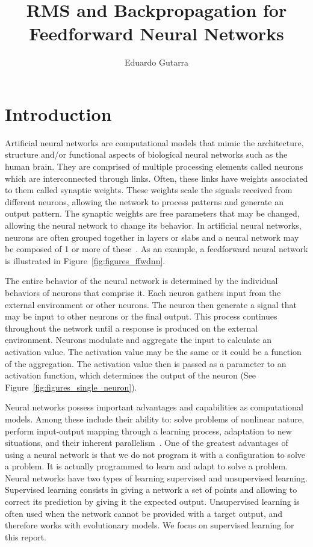 \documentclass[11pt]{article}
\title{RMS and Backpropagation for Feedforward Neural Networks}
\author{Eduardo Gutarra}
\begin{document}
	
\ifpdf
{}
\else
{}
\fi
	
\maketitle
	
\section{Introduction} %
\label{sec:introduction}

Artificial neural networks are computational models that mimic the architecture, structure and/or functional aspects of biological
neural networks such as the human brain. They are comprised of multiple processing elements called neurons which are interconnected
through links. Often, these links have weights associated to them called synaptic weights. These weights scale the signals received from
different neurons, allowing the network to process patterns and generate an output pattern. The synaptic weights are free parameters
that may be changed, allowing the neural network to change its behavior. In artificial neural networks, neurons are often grouped
together in layers or slabs and a neural network may be composed of 1 or more of these~\cite{skapura}. As an example, a feedforward
neural network is illustrated in Figure~\ref{fig:figures_ffwdnn}.

The entire behavior of the neural network is determined by the individual behaviors of neurons that comprise it. Each neuron gathers
input from the external environment or other neurons. The neuron then generate a signal that may be input to other neurons or the final
output. This process continues throughout the network until a response is produced on the external environment. Neurons modulate and
aggregate the input to calculate an activation value. The activation value may be the same or it could be a function of the aggregation.
The activation value then is passed as a parameter to an activation function, which determines the output of the neuron (See Figure~\ref{fig:figures_single_neuron}).

Neural networks possess important advantages and capabilities as computational models. Among these include their ability to: solve
problems of nonlinear nature, perform input-output mapping through a learning process, adaptation to new situations, and their inherent
parallelism~\cite{Haykin:1994:NNC:541500}. One of the greatest advantages of using a neural network is that we do not program it with a
configuration to solve a problem. It is actually programmed to learn and adapt to solve a problem. Neural networks have two types of
learning supervised and unsupervised learning. Supervised learning consists in giving a network a set of points and allowing to correct
its prediction by giving it the expected output. Unsupervised learning is often used when the network cannot be provided with a target
output, and therefore works with evolutionary models. We focus on supervised learning for this report.
\end{document}
